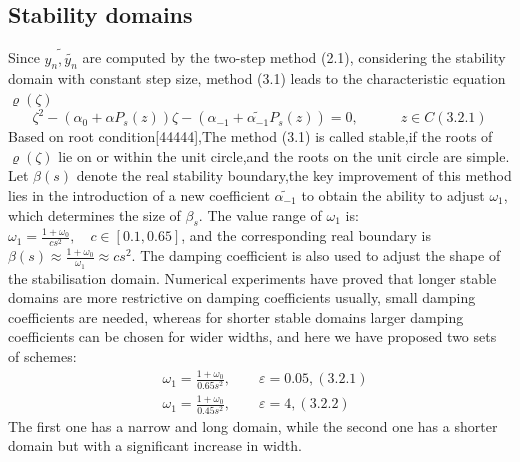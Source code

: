 \documentclass[review]{elsarticle}
\begin{document}
\subsection{Stability domains}
Since $\tilde{y_{n},\tilde{y_n}}$ are computed by the two-step method (2.1), considering the stability domain with  constant step size, method (3.1) leads to the characteristic equation $\varrho(\zeta)$
$$
\zeta^2-(\alpha_0+\alpha P_s(z))\zeta-(\alpha_{-1}+\tilde{\alpha_{-1}}P_s(z))=0,\quad\quad\quad z\in C     (3.2.1)
$$
Based on root condition[44444],The method (3.1) is called stable,if the roots of $\varrho(\zeta)$ lie on or within the unit circle,and the roots on the unit circle are simple.
Let $\beta(s)$ denote the real stability boundary,the key improvement of this method lies in the introduction of a new coefficient $\tilde{\alpha_{-1}}$ to obtain the ability to adjust $\omega_1$, which determines the size of $\beta_{s}$.
 The value range of $\omega_1$ is: $\omega_1=\frac{1+\omega_0}{cs^2},\quad c \in [0.1,0.65]$, and the corresponding real boundary is $\beta(s)\approx\frac{1+\omega _0}{\omega_1}\approx cs^2 $. The damping coefficient is also used to adjust the shape of the stabilisation domain. 
 Numerical experiments have proved that longer stable domains are more restrictive on damping coefficients usually, 
 small damping coefficients are needed, whereas for shorter stable domains larger damping coefficients can be chosen for wider widths, and here we have proposed two sets of schemes:
\begin{align}
    &\omega_1=\frac{1+\omega_0}{0.65 s^2},\quad \quad \varepsilon=0.05,(3.2.1)\nonumber \\
    &\omega_1=\frac{1+\omega_0}{0.45 s^2},\quad \quad \varepsilon=4,(3.2.2)\nonumber
\end{align}
The first one has a narrow and long domain, while the second one has a shorter domain but with a significant increase in width.
\end{document}
